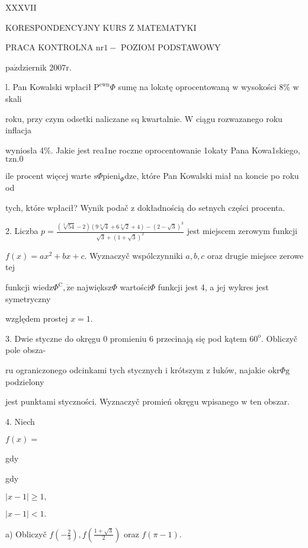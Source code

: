 \documentclass[a4paper,12pt]{article}
\begin{document}
XXXVII

KORESPONDENCYJNY KURS Z MATEMATYKI

PRACA KONTROLNA $\mathrm{n}\mathrm{r}1-$ POZIOM PODSTAWOWY

$\mathrm{p}\mathrm{a}\acute{\mathrm{z}}$dziernik 2$007\mathrm{r}.$

l. Pan Kowalski wpłacił $\mathrm{P}^{\mathrm{e}\mathrm{w}\mathrm{n}}\Phi$ sumę na lokatę oprocentowaną $\mathrm{w}$ wysokości 8\% $\mathrm{w}$ skali

roku, przy czym odsetki naliczane sq kwartalnie. $\mathrm{W}$ ciągu rozwazanego roku inflacja

wyniosła 4\%. Jakie jest rea1ne roczne oprocentowanie 1okaty Pana Kowa1skiego, $\mathrm{t}\mathrm{z}\mathrm{n}. 0$

ile procent więcej warte $\mathrm{s}\Phi \mathrm{p}\mathrm{i}\mathrm{e}\mathrm{n}\mathrm{i}_{\Phi}\mathrm{d}\mathrm{z}\mathrm{e}$, które Pan Kowalski miał na koncie po roku od

tych, które wpłacił? Wynik podač $\mathrm{z}$ dokładnością do setnych części procenta.

2. Liczba $p=\displaystyle \frac{(\sqrt[3]{54}-2)(9\sqrt[3]{4}+6\sqrt[3]{2}+4)-(2-\sqrt{3})^{3}}{\sqrt{3}+(1+\sqrt{3})^{2}}$ jest miejscem zerowym funkcji

$f(x) = ax^{2}+bx+c$. Wyznaczyč wspólczynniki $a, b, c$ oraz drugie miejsce zerowe tej

funkcji $\mathrm{w}\mathrm{i}\mathrm{e}\mathrm{d}\mathrm{z}\Phi^{\mathrm{C}}, \dot{\mathrm{z}}\mathrm{e}$ największ$\Phi$ wartości$\Phi$ funkcji jest 4, a jej wykres jest symetryczny

względem prostej $x=1.$

3. Dwie styczne do okręgu $0$ promieniu 6 przecinają się pod kątem $60^{\mathrm{o}}$. Obliczyč pole obsza-

ru ograniczonego odcinkami tych stycznych $\mathrm{i}$ krótszym $\mathrm{z}$ łuków, najakie $\mathrm{o}\mathrm{k}\mathrm{r}\Phi \mathrm{g}$ podzielony

jest punktami styczności. Wyznaczyč promień okręgu wpisanego $\mathrm{w}$ ten obszar.

4. Niech

$f(x)=$

gdy

gdy

$|x-1|\geq 1,$

$|x-1|<1.$

a) Obliczyč $f(-\displaystyle \frac{2}{3}), f(\displaystyle \frac{1+\sqrt{3}}{2})$ oraz $f(\pi-1).$
\end{document}
